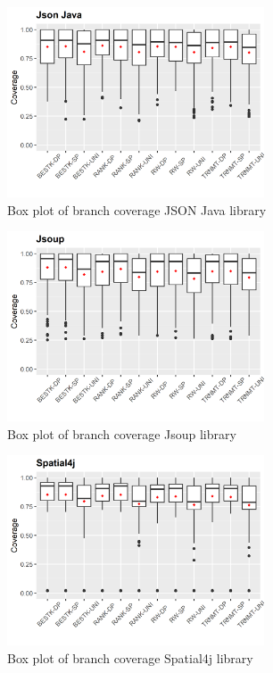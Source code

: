 \documentclass[sigconf]{acmart}
\begin{document}
\begin{figure}[h]
  \centering
  \includegraphics[width=3in]{../output/json-java-boxplot.png}
  \caption{Box plot of branch coverage JSON Java library}
  \label{fig:boxplot6}
\end{figure}

\begin{figure}[h]
  \centering
  \includegraphics[width=3in]{../output/jsoup-boxplot.png}
  \caption{Box plot of branch coverage Jsoup library}
  \label{fig:boxplot7}
\end{figure}

\begin{figure}[h]
  \centering
  \includegraphics[width=3in]{../output/spatial4j-boxplot.png}
  \caption{Box plot of branch coverage Spatial4j library}
  \label{fig:boxplot8}
\end{figure}
\end{document}
